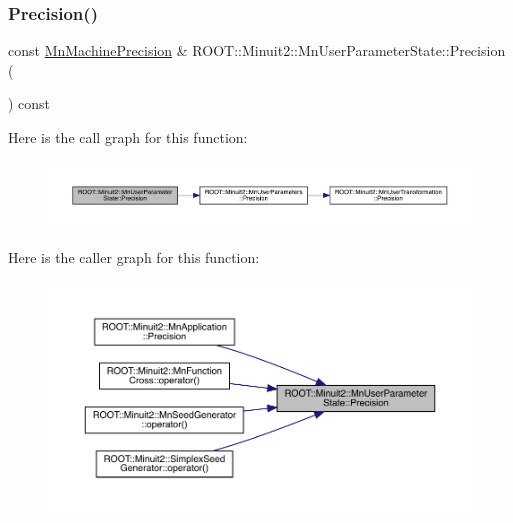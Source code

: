 \subsubsection{\texorpdfstring{Precision()}{Precision()}\hspace{0.1cm}{\footnotesize\ttfamily [1/2]}}
{\footnotesize\ttfamily const \mbox{\hyperlink{classROOT_1_1Minuit2_1_1MnMachinePrecision}{Mn\+Machine\+Precision}} \& R\+O\+O\+T\+::\+Minuit2\+::\+Mn\+User\+Parameter\+State\+::\+Precision (\begin{DoxyParamCaption}{ }\end{DoxyParamCaption}) const}

Here is the call graph for this function\+:\nopagebreak
\begin{figure}[H]
\begin{center}
\leavevmode
\includegraphics[width=350pt]{d3/de0/classROOT_1_1Minuit2_1_1MnUserParameterState_a03f90db04e5573afaef3865d0d87b85b_cgraph}
\end{center}
\end{figure}
Here is the caller graph for this function\+:\nopagebreak
\begin{figure}[H]
\begin{center}
\leavevmode
\includegraphics[width=350pt]{d3/de0/classROOT_1_1Minuit2_1_1MnUserParameterState_a03f90db04e5573afaef3865d0d87b85b_icgraph}
\end{center}
\end{figure}
\mbox{\label{classROOT_1_1Minuit2_1_1MnUserParameterState_aff32da1a78b79f578541e42e91e37563}} 
